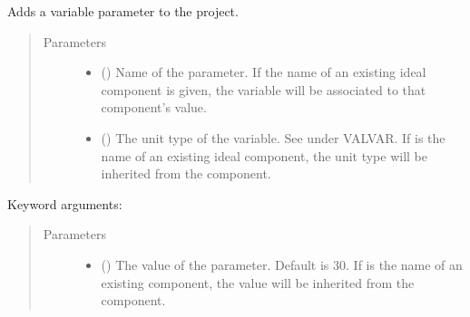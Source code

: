 \documentclass[letterpaper,10pt,english,openany]{sphinxmanual}
\begin{document}
\begin{fulllineitems}
\begin{fulllineitems}
\begin{quote}
\begin{description}
\begin{itemize}
\end{itemize}

\end{description}\end{quote}

\end{fulllineitems}


\begin{fulllineitems}
\label{\detokenize{source/sonpy:sonpy.sonnet.addParameter}}
Adds a variable parameter to the project.
\begin{quote}\begin{description}
\item[{Parameters}] \leavevmode\begin{itemize}
\item {} 
 () \textendash{} Name of the parameter. If the name of an existing ideal component is given, the variable will be associated to that component’s value.

\item {} 
 () \textendash{} The unit type of the variable. See \label{\detokenize{source/sonpy:id28}}{\hyperref[\detokenize{source/users_guide:son15}]{\sphinxcrossref{{[}Son15{]}}}} under VALVAR. If  is the name of an existing ideal component, the unit type will be inherited from the component.

\end{itemize}

\end{description}\end{quote}

Keyword arguments:
\begin{quote}\begin{description}
\item[{Parameters}] \leavevmode\begin{itemize}
\item {} 
 () \textendash{} The value of the parameter. Default is 30. If  is the name of an existing component, the value will be inherited from the component.


\end{itemize}
\end{description}
\end{quote}
\end{fulllineitems}
\end{fulllineitems}
\end{document}
